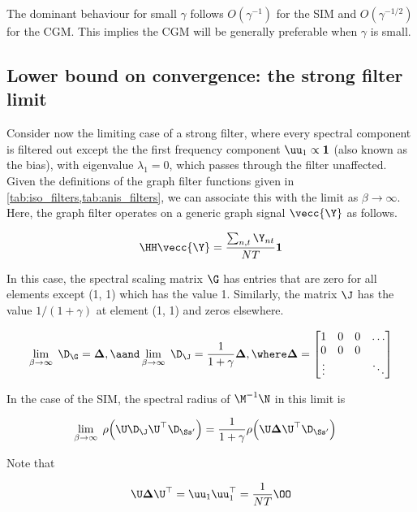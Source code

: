 The dominant behaviour for small $\gamma$ follows $O(\gamma^{-1})$ for the SIM and $O(\gamma^{-1/2})$ for the CGM. This implies the CGM will be generally preferable when $\gamma$ is small.  


\subsection{Lower bound on convergence: the strong filter limit}

Consider now the limiting case of a strong filter, where every spectral component is filtered out except the the first frequency component $\uu_1 \propto \mathbf{1}$ (also known as the bias), with eigenvalue $\lambda_1 = 0$, which passes through the filter unaffected. Given the definitions of the graph filter functions given in \cref{tab:iso_filters,tab:anis_filters}, we can associate this with the limit as $\beta \rightarrow \infty$. Here, the graph filter operates on a generic graph signal $\vecc{\Y}$ as follows. 

$$
\HH \vecc{\Y} = \frac{\sum_{n, t} \Y_{nt}}{NT} \mathbf{1}
$$


In this case, the spectral scaling matrix $\G$ has entries that are zero for all elements except (1, 1) which has the value 1. Similarly, the matrix $\J$ has the value $1 / (1 + \gamma)$ at element (1, 1) and zeros elsewhere. 


$$
\lim_{\beta \rightarrow \infty} \; \D_\G = \mathbf{\Delta}, \aand \lim_{\beta \rightarrow \infty} \; \D_\J = \frac{1}{1 + \gamma} \mathbf{\Delta}, \where     \mathbf{\Delta} = \begin{bmatrix}
    1 & 0 & 0 & \dots \\
    0 & 0 & 0 &  \\
    \vdots & & & \ddots
\end{bmatrix} 
$$

 In the case of the SIM, the spectral radius of $\M^{-1}\N$ in this limit is 

\begin{align*}
    \lim_{\beta \rightarrow \infty} \; \rho\Big(\U \D_\J \U^\top \D_{\Ss'} \Big) &= \frac{1}{1 + \gamma} \rho\Big(\U \mathbf{\Delta} \U^\top \D_{\Ss'} \Big)
\end{align*}

Note that 

\begin{equation*}
    \U \mathbf{\Delta} \U^\top = \uu_1 \uu_1^\top  = \frac{1}{NT} \OO
\end{equation*}


